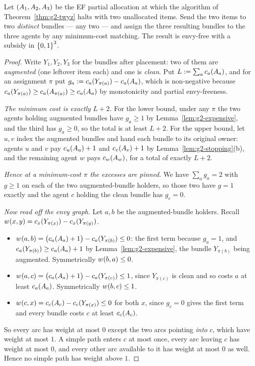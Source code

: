\begin{theorem}
\label{thm:g2-r2}
Let $(A_{1},A_{2},A_{3})$ be the EF partial allocation at which the
algorithm of Theorem~\ref{thm:g2-twyz} halts with two unallocated items. Send the
two items to two \emph{distinct} bundles --- any two --- and assign the three
resulting bundles to the three agents by any minimum-cost matching. The
result is envy-free with a subsidy in $\left\{0,1\right\}^3$.
\end{theorem}
\begin{proof}
Write $Y_1,Y_2,Y_3$ for the bundles after placement: two of them are
\emph{augmented} (one leftover item each) and one is \emph{clean}. Put
$L := \sum_a c_a(A_{a})$, and for an assignment $\pi$ put
$g_a := c_a(Y_{\pi(a)}) - c_a(A_{a})$, which is non-negative
because $c_a(Y_{\pi(a)}) \ge c_a(A_{\pi(a)}) \ge
c_a(A_{a})$ by monotonicity and partial envy-freeness.

\emph{The minimum cost is exactly $L + 2$.} For the lower bound, under any
$\pi$ the two agents holding augmented bundles have $g_a \ge 1$ by
Lemma~\ref{lem:g2-expensive}, and the third has $g_a \ge 0$, so the total is at
least $L+2$. For the upper bound, let $u,v$ index the augmented bundles and
hand each bundle to its original owner: agents $u$ and $v$ pay
$c_u(A_{u}) + 1$ and $c_v(A_{v})+1$ by
Lemma~\ref{lem:g2-stopping}(b), and the remaining agent $w$ pays
$c_w(A_{w})$, for a total of exactly $L+2$.

\emph{Hence at a minimum-cost $\pi$ the excesses are pinned.} We have
$\sum_a g_a = 2$ with $g \ge 1$ on each of the two augmented-bundle holders,
so those two have $g = 1$ exactly and the agent $c$ holding the clean bundle
has $g_c = 0$.

\emph{Now read off the envy graph.} Let $a,b$ be the augmented-bundle
holders. Recall $w_{}(x,y) = c_x(Y_{\pi(x)}) - c_x(Y_{\pi(y)})$.
\begin{itemize}
  \item $w_{}(a,b) = \bigl(c_a(A_{a}) + 1\bigr) -
        c_a(Y_{\pi(b)}) \le 0$: the first term because $g_a = 1$, and
        $c_a(Y_{\pi(b)}) \ge c_a(A_{a}) + 1$ by
        Lemma~\ref{lem:g2-expensive}, the bundle $Y_{\pi(b)}$ being augmented.
        Symmetrically $w_{}(b,a) \le 0$.
  \item $w_{}(a,c) = \bigl(c_a(A_{a})+1\bigr) -
        c_a(Y_{\pi(c)}) \le 1$, since $Y_{\pi(c)}$ is clean and so costs
        $a$ at least $c_a(A_{a})$. Symmetrically
        $w_{}(b,c) \le 1$.
  \item $w_{}(c,x) = c_c(A_{c}) - c_c(Y_{\pi(x)}) \le 0$ for
        both $x$, since $g_c = 0$ gives the first term and every bundle
        costs $c$ at least $c_c(A_{c})$.
\end{itemize}
So every arc has weight at most $0$ except the two arcs pointing \emph{into}
$c$, which have weight at most $1$. A simple path enters $c$ at most once,
every arc leaving $c$ has weight at most $0$, and every other arc available
to it has weight at most $0$ as well. Hence no simple path has weight above
$1$.


\end{proof}
